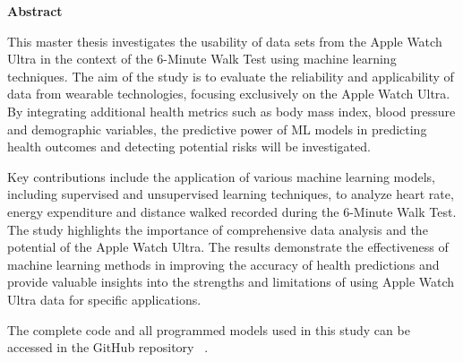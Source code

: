 \newenvironment{abstract}%
    {\cleardoublepage\thispagestyle{empty}\null\vfill\begin{center}%
    \bfseries Abstract\end{center}}%
    {\vfill\null}
        \begin{abstract}
        \footnotesize{This master thesis investigates the usability of data sets from the Apple Watch Ultra in the context of the 6-Minute Walk Test using machine learning techniques. The aim of the study is to evaluate the reliability and applicability of data from wearable technologies, focusing exclusively on the Apple Watch Ultra. By integrating additional health metrics such as body mass index, blood pressure and demographic variables, the predictive power of ML models in predicting health outcomes and detecting potential risks will be investigated.
        
        Key contributions include the application of various machine learning models, including supervised and unsupervised learning techniques, to analyze heart rate, energy expenditure and distance walked recorded during the 6-Minute Walk Test. The study highlights the importance of comprehensive data analysis and the potential of the Apple Watch Ultra. The results demonstrate the effectiveness of machine learning methods in improving the accuracy of health predictions and provide valuable insights into the strengths and limitations of using Apple Watch Ultra data for specific applications. 

        The complete code and all programmed models used in this study can be accessed in the GitHub repository ~\cite{githubMasterthesisjupyter_folderMain}.
        }
        \end{abstract}
        \clearpage